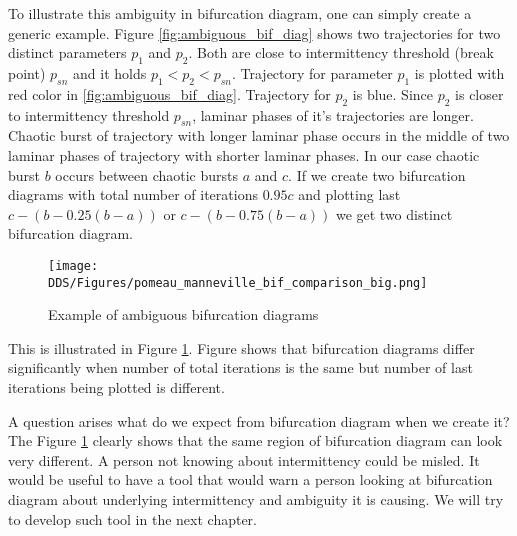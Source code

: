 To illustrate this ambiguity in bifurcation diagram, one can simply create a generic example.
Figure \ref{fig:ambiguous_bif_diag} shows two trajectories for two distinct parameters $p_1$ and $p_2$.
Both are close to intermittency threshold (break point) $p_{sn}$ and it holds $p_1 < p_2 < p_{sn}$.
Trajectory for parameter $p_1$ is plotted with red color in \ref{fig:ambiguous_bif_diag}.
Trajectory for $p_2$ is blue.
Since $p_2$ is closer to intermittency threshold $p_{sn}$, laminar phases of it's trajectories are longer.
Chaotic burst of trajectory with longer laminar phase occurs in the middle of two laminar phases of trajectory with shorter laminar phases.
In our case chaotic burst $b$ occurs between chaotic bursts $a$ and $c$.
If we create two bifurcation diagrams with total number of iterations $0.95 c$ and plotting last $c-(b-0.25(b-a))$ or $c-(b-0.75(b-a))$ we get two distinct bifurcation diagram.


\begin{figure}[!h]
    \centering
    \texttt{[image: DDS/Figures/pomeau\_manneville\_bif\_comparison\_big.png]}
    \caption{Example of ambiguous bifurcation diagrams}
    \label{fig:ambiguous_bif_diag_example}
\end{figure}

This is illustrated in Figure \ref{fig:ambiguous_bif_diag_example}.
Figure shows that bifurcation diagrams differ significantly when number of total iterations is the same but number of last iterations being plotted is different.
\par
A question arises what do we expect from bifurcation diagram when we create it?
The Figure \ref{fig:ambiguous_bif_diag_example} clearly shows that the same region of bifurcation diagram can look very different.
A person not knowing about intermittency could be misled.
It would be useful to have a tool that would warn a person looking at bifurcation diagram about underlying intermittency and ambiguity it is causing.
We will try to develop such tool in the next chapter.

\endinput